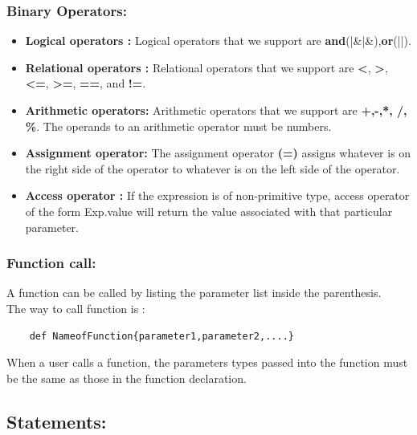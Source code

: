 \documentclass[english,a4paper,12pt]{report}
\begin{document}
\subsubsection{Binary Operators:}
\begin{itemize}
    \item \textbf{Logical operators :}
Logical operators that we support are \textbf{and}(|\&|\&),\textbf{or}(||).
    \item \textbf{Relational operators :}
    Relational operators that we support are \textbf{<}, \textbf{>}, \textbf{<=}, \textbf{>=}, \textbf{==}, and \textbf{!=}. 
\item \textbf{Arithmetic operators:}
Arithmetic operators that we support are  \textbf{+,-,*, /, \%}. The operands to an arithmetic operator
must be numbers. 
\item \textbf{Assignment operator:}
The assignment operator \textbf{(=)} assigns whatever is on the right side of the operator to
whatever is on the left side of the operator.
\item \textbf{Access operator :}
If the expression is of non-primitive type, access operator of the form Exp.value will return the value
associated with that particular parameter.
\end{itemize}
\subsubsection{Function call:}
A function can be called by listing the parameter list inside the parenthesis.\\The way to call function is : 
\begin{verbatim}
    def NameofFunction{parameter1,parameter2,....}
\end{verbatim}

When a user calls a function, the parameters types passed into the function must be
the same as those in the function declaration.
\subsection{Statements:}
\end{document}
